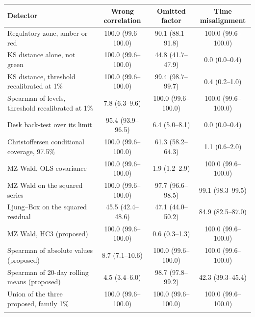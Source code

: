 \begin{table}[htbp]
\vspace{1.5ex}

\begin{tabular}{>{\raggedright\arraybackslash}p{5.2cm}ccc}
\toprule
Detector & \shortstack{Wrong\\correlation} & \shortstack{Omitted\\factor} & \shortstack{Time\\misalignment} \\
\midrule
Regulatory zone, amber or red & 100.0 (99.6--100.0) & 90.1 (88.1--91.8) & 100.0 (99.6--100.0) \\ \addlinespace[0.8ex]
KS distance alone, not green & 100.0 (99.6--100.0) & 44.8 (41.7--47.9) & 0.0 (0.0--0.4) \\ \addlinespace[0.8ex]
KS distance, threshold recalibrated at 1\% & 100.0 (99.6--100.0) & 99.4 (98.7--99.7) & 0.4 (0.2--1.0) \\ \addlinespace[0.8ex]
Spearman of levels, threshold recalibrated at 1\% & 7.8 (6.3--9.6) & 100.0 (99.6--100.0) & 100.0 (99.6--100.0) \\ \addlinespace[0.8ex]
Desk back-test over its limit & 95.4 (93.9--96.5) & 6.4 (5.0--8.1) & 0.0 (0.0--0.4) \\ \addlinespace[0.8ex]
Christoffersen conditional coverage, 97.5\% & 100.0 (99.6--100.0) & 61.3 (58.2--64.3) & 1.1 (0.6--2.0) \\ \addlinespace[0.8ex]
MZ Wald, OLS covariance & 100.0 (99.6--100.0) & 1.9 (1.2--2.9) & 100.0 (99.6--100.0) \\ \addlinespace[0.8ex]
MZ Wald on the squared series & 100.0 (99.6--100.0) & 97.7 (96.6--98.5) & 99.1 (98.3--99.5) \\ \addlinespace[0.8ex]
Ljung--Box on the squared residual & 45.5 (42.4--48.6) & 47.1 (44.0--50.2) & 84.9 (82.5--87.0) \\ \addlinespace[0.8ex]
MZ Wald, HC3 (proposed) & 100.0 (99.6--100.0) & 0.6 (0.3--1.3) & 100.0 (99.6--100.0) \\ \addlinespace[0.8ex]
Spearman of absolute values (proposed) & 8.7 (7.1--10.6) & 100.0 (99.6--100.0) & 100.0 (99.6--100.0) \\ \addlinespace[0.8ex]
Spearman of 20-day rolling means (proposed) & 4.5 (3.4--6.0) & 98.7 (97.8--99.2) & 42.3 (39.3--45.4) \\ \addlinespace[0.8ex]
Union of the three proposed, family 1\% & 100.0 (99.6--100.0) & 100.0 (99.6--100.0) & 100.0 (99.6--100.0) \\ \addlinespace[0.8ex]
\bottomrule
\end{tabular}
\end{table}
